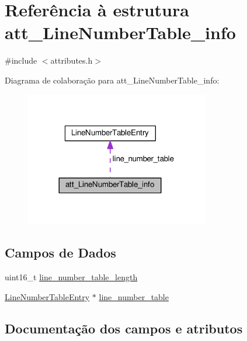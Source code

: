 \hypertarget{structatt__LineNumberTable__info}{}\section{Referência à estrutura att\+\_\+\+Line\+Number\+Table\+\_\+info}
\label{structatt__LineNumberTable__info}


{\ttfamily \#include $<$attributes.\+h$>$}



Diagrama de colaboração para att\+\_\+\+Line\+Number\+Table\+\_\+info\+:\nopagebreak
\begin{figure}[H]
\begin{center}
\leavevmode
\includegraphics[width=228pt]{structatt__LineNumberTable__info__coll__graph}
\end{center}
\end{figure}
\subsection*{Campos de Dados}
\begin{DoxyCompactItemize}
\item 
uint16\+\_\+t \hyperlink{structatt__LineNumberTable__info_a6c335e2b6b14577d9a0e063cd5a361e0}{line\+\_\+number\+\_\+table\+\_\+length}
\item 
\hyperlink{structLineNumberTableEntry}{Line\+Number\+Table\+Entry} $\ast$ \hyperlink{structatt__LineNumberTable__info_ac9c52cc4b931ea8cfc746ea0a1d573ac}{line\+\_\+number\+\_\+table}
\end{DoxyCompactItemize}


\subsection{Documentação dos campos e atributos}
